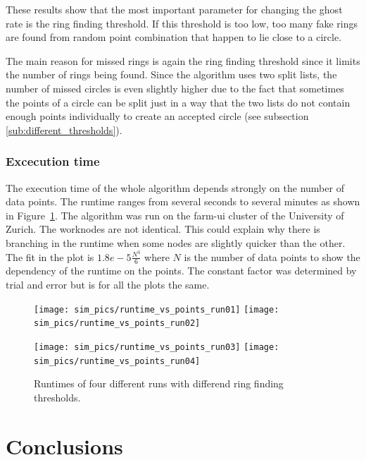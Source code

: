 \documentclass[11pt]{scrreprt}
\begin{document}
These results show that the most important parameter for changing the ghost rate is the ring finding threshold.
If this threshold is too low, too many fake rings are found from random point combination that happen to lie close to a circle.

The main reason for missed rings is again the ring finding threshold since it limits the number of rings
being found. Since the algorithm uses two split lists, the number of missed circles is even slightly higher due to the
fact that sometimes the points of a circle can be split just in a way that the two lists do not
contain enough points individually to create an accepted circle (see subsection \ref{sub:different_thresholds}).
\subsection{Excecution time} %
\label{sub:runtime}

The execution time of the whole algorithm depends strongly on the number of data points. The runtime ranges from several seconds to several minutes as shown in Figure~\ref{fig:runtime}. The algorithm was run on the farm-ui cluster of the University of Zurich. The worknodes are not identical. This could explain why there is branching in the runtime when some nodes are slightly quicker than the other. The fit in the plot is $1.8e{-}5\frac{N^3}{6}$ where $N$ is the number of data points to show the dependency of the runtime on the points. The constant factor was determined by trial and error but is for all the plots the same.

\begin{figure}[tb]
  \centering
  \texttt{[image: sim\_pics/runtime\_vs\_points\_run01]}%
  \texttt{[image: sim\_pics/runtime\_vs\_points\_run02]}

  \texttt{[image: sim\_pics/runtime\_vs\_points\_run03]}%
  \texttt{[image: sim\_pics/runtime\_vs\_points\_run04]}
  \caption[Runtimes of four different runs]{Runtimes of four different runs with differend ring finding thresholds. }
  \label{fig:runtime}
\end{figure}





\chapter{Conclusions} %
\label{cha:conclusions}
\end{document}
